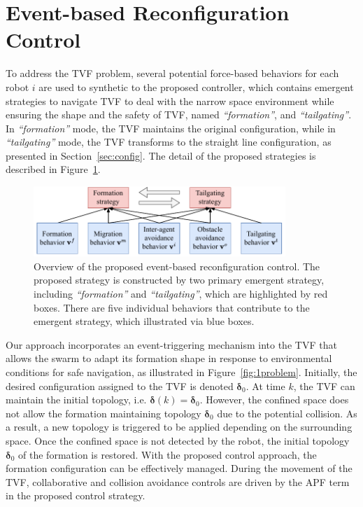 \section{Event-based Reconfiguration Control}\label{sec3}

To address the TVF problem, several potential force-based behaviors for each robot $i$ are used to synthetic to the proposed controller, which contains emergent strategies to navigate TVF to deal with the narrow space environment while ensuring the shape and the safety of TVF, named \textit{``formation''}, and \textit{``tailgating''}. In \textit{``formation''} mode, the TVF maintains the original configuration, while in \textit{``tailgating''} mode, the TVF transforms to the straight line configuration, as presented in Section~\ref{sec:config}. The detail of the proposed strategies is described in Figure~\ref{fig:1control_diagram}.

\begin{figure}
    \centering
    \includegraphics[width=0.85\textwidth]{paper2/images/control_diagram.pdf}
    \caption{Overview of the proposed event-based reconfiguration control. The proposed strategy is constructed by two primary emergent strategy, including \textit{``formation''} and \textit{``tailgating''}, which are highlighted by red boxes. There are five individual behaviors that contribute to the emergent strategy, which illustrated via blue boxes.}
    \label{fig:1control_diagram}
\end{figure}

Our approach incorporates an event-triggering mechanism into the TVF that allows the swarm to adapt its formation shape in response to environmental conditions for safe navigation, as illustrated in Figure~\ref{fig:1problem}. Initially, the desired configuration assigned to the TVF is denoted $\mathbf{\delta}_0$. At time $k$, the TVF can maintain the initial topology, i.e. $\mathbf{\delta}(k)=\mathbf{\delta}_0$. However, the confined space does not allow the formation maintaining topology $\mathbf{\delta}_0$ due to the potential collision. As a result, a new topology is triggered to be applied depending on the surrounding space. Once the confined space is not detected by the robot, the initial topology $\mathbf{\delta}_0$ of the formation is restored. With the proposed control approach, the formation configuration can be effectively managed. During the movement of the TVF, collaborative and collision avoidance controls are driven by the APF term in the proposed control strategy.

